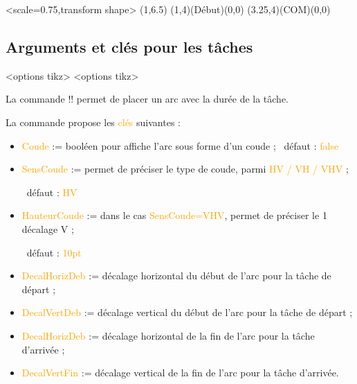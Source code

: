 \documentclass[french,a4paper,11pt]{article}
\newcommand\Cle[1]{{\small\sffamily\textlangle \textcolor{orange}{#1}\textrangle}}
\begin{document}
{{\begin{DemoCode}[]
\begin{GrapheMPM}[CouleurDates=green/orange,CouleurBords=brown,Grille={18,8}]%
	<scale=0.75,transform shape>
	\MPMPlaceNotice(1,6.5)
	\MPMPlaceTache(1,4)(Début)(0,0)
	\MPMPlaceTache(3.25,4)(COM)(0,0)
\end{GrapheMPM}
\end{DemoCode}

\pagebreak

\subsection{Arguments et clés pour les tâches}

\begin{DemoCode}
\begin{GrapheMPM}[clés]<options tikz>
	<options tikz>
\end{GrapheMPM}
\end{DemoCode}

\begin{tipblock}
La commande \motcletex!\MPMPlaceDuree! permet de placer un arc avec la durée de la tâche.

\smallskip

La commande propose les \Cle{clés} suivantes :

\begin{itemize}
	\item \Cle{Coude} := booléen pour affiche l'arc sous forme d'un coude ; \hfill~défaut : \Cle{false}
	\item \Cle{SensCoude} := permet de préciser le type de coude, parmi \Cle{HV / VH / VHV} ;
	
	\hfill~défaut : \Cle{HV}
	\item \Cle{HauteurCoude} := dans le cas \Cle{SensCoude=VHV}, permet de préciser le 1\ier{} décalage V ;
	
	\hfill~défaut : \Cle{10pt}
	\item \Cle{DecalHorizDeb} := décalage horizontal du début de l'arc pour la tâche de départ ;
	\item \Cle{DecalVertDeb} := décalage vertical du début de l'arc pour la tâche de départ ;
	\item \Cle{DecalHorizDeb} := décalage horizontal de la fin de l'arc pour la tâche d'arrivée ;
	\item \Cle{DecalVertFin} := décalage vertical de la fin de l'arc pour la tâche d'arrivée.
	

\end{itemize}
\end{tipblock}}}
\end{document}
